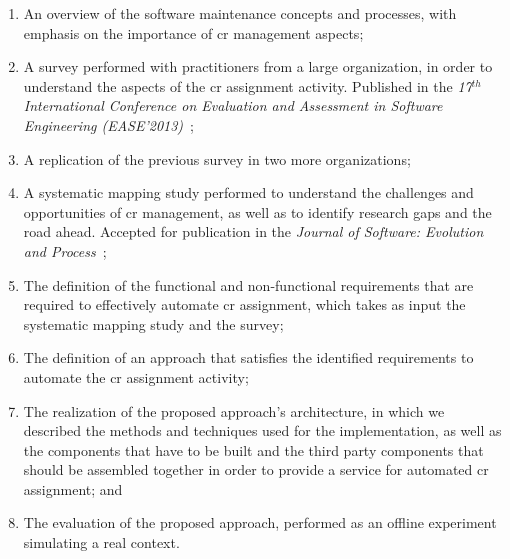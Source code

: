 \begin{enumerate}
  \item An overview of the software maintenance concepts and processes, with
  emphasis on the importance of \ac{cr} management aspects;
  \item A survey performed with practitioners from a large organization, in
  order to understand the aspects of the \ac{cr} assignment
  activity. Published in the \emph{17$^{th}$ International Conference on Evaluation
  and Assessment in Software Engineering (EASE'2013)}~\citep{CavalcantiEASE2013};
  \item A replication of the previous survey in two more organizations;
  \item A systematic mapping study performed to understand the challenges and
  opportunities of \ac{cr} management, as well as to identify research gaps and
  the road ahead. Accepted for publication in the
  \emph{Journal of Software: Evolution and Process}~\citep{CavalcantiJSEP2013};
  \item The definition of the functional and non-functional requirements that
  are required to effectively automate \ac{cr} assignment, which takes as input
  the systematic mapping study and the survey;
  \item The definition of an approach that satisfies the
  identified requirements to automate the \ac{cr} assignment activity;
  \item The realization of the proposed approach's architecture, in which we
  described the methods and techniques used for the implementation, as well as the
  components that have to be built and the third party components that should be
  assembled together in order to provide a service for automated \ac{cr}
  assignment; and
  \item The evaluation of the proposed approach, performed as an offline
  experiment simulating a real context.
\end{enumerate}